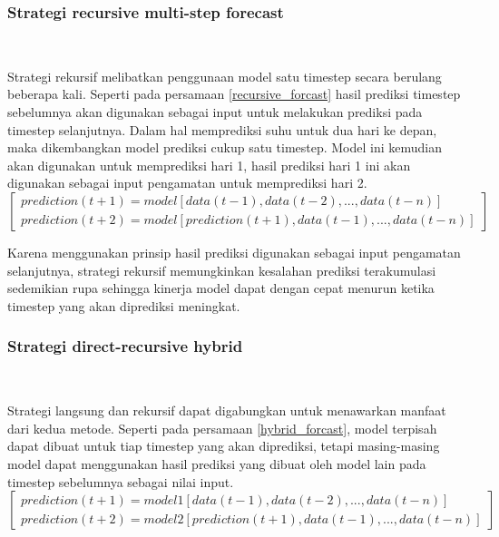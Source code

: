 \documentclass[../thesis.tex]{subfiles}
\begin{document}
\subsubsection{Strategi recursive multi-step forecast} \hfill\

Strategi rekursif melibatkan penggunaan model satu timestep secara berulang beberapa kali. Seperti pada persamaan \ref{recursive_forcast} hasil prediksi timestep sebelumnya akan digunakan sebagai input untuk melakukan prediksi pada timestep selanjutnya.
Dalam hal memprediksi suhu untuk dua hari ke depan, maka dikembangkan model prediksi cukup satu timestep. Model ini kemudian akan digunakan untuk memprediksi hari 1, hasil prediksi hari 1 ini akan digunakan sebagai input pengamatan untuk memprediksi hari 2.
\begin{equation} \label{recursive_forcast}
\begin{bmatrix}
		prediction(t+1) = model[data(t-1), data(t-2), ..., data(t-n)]
		\\prediction(t+2) = model[prediction(t+1), data(t-1), ..., data(t-n)]
\end{bmatrix}
\end{equation}

Karena menggunakan prinsip hasil prediksi digunakan sebagai input pengamatan selanjutnya, strategi rekursif memungkinkan kesalahan prediksi terakumulasi sedemikian rupa sehingga kinerja model dapat dengan cepat menurun ketika timestep yang akan diprediksi meningkat.

\subsubsection{Strategi direct-recursive hybrid} \hfill\

Strategi langsung dan rekursif dapat digabungkan untuk menawarkan manfaat dari kedua metode.
Seperti pada persamaan \ref{hybrid_forcast}, model terpisah dapat dibuat untuk tiap timestep yang akan diprediksi, tetapi masing-masing model dapat menggunakan hasil prediksi yang dibuat oleh model lain pada timestep sebelumnya sebagai nilai input.
\begin{equation} \label{hybrid_forcast}
\begin{bmatrix}
		prediction(t+1) = model1[data(t-1), data(t-2), ..., data(t-n)]
		\\prediction(t+2) = model2[prediction(t+1), data(t-1), ..., data(t-n)]
\end{bmatrix}
\end{equation}
\end{document}

